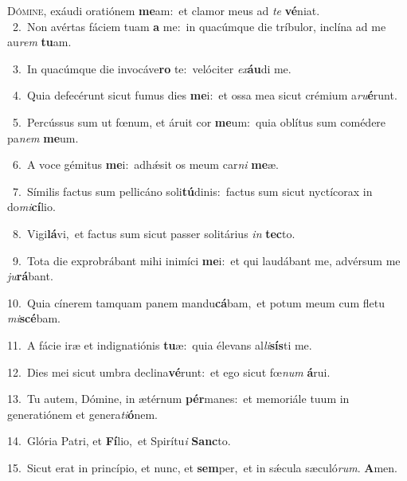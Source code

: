 \lettrine{\initial\textcolor{\initialcolor}{D}}{ómine,} exáudi oratiónem \textbf{me}\-am:~\star et clamor meus ad \textit{te} \textbf{vé}\-niat.\\
{\numbfont\textcolor{\numbcolor}{~2.}}~Non avértas fáciem tuam \textbf{a} me:~\star in quacúmque die tríbulor, inclína ad me au\textit{rem} \textbf{tu}\-am.\par
{\numbfont\textcolor{\numbcolor}{~3.}}~In quacúmque die invocáve\textbf{ro} te:~\star velóciter \textit{ex}\-\textbf{áu}di me.\par
{\numbfont\textcolor{\numbcolor}{~4.}}~Quia defecérunt sicut fumus dies \textbf{me}\-i:~\star et ossa mea sicut crémium a\-\textit{ru}\-\textbf{é}runt.\par
{\numbfont\textcolor{\numbcolor}{~5.}}~Percússus sum ut fœnum, et áruit cor \textbf{me}\-um:~\star quia oblítus sum comédere pa\textit{nem} \textbf{me}\-um.\par
{\numbfont\textcolor{\numbcolor}{~6.}}~A voce gémitus \textbf{me}\-i:~\star adhǽsit os meum car\textit{ni} \textbf{me}\-æ.\par
{\numbfont\textcolor{\numbcolor}{~7.}}~Símilis factus sum pellicáno soli\-\textbf{tú}\-dinis:~\star factus sum sicut nyctícorax in do\-\textit{mi}\-\textbf{cí}lio.\par
{\numbfont\textcolor{\numbcolor}{~8.}}~Vigi\-\textbf{lá}\-vi,~\star et factus sum sicut passer solitárius \textit{in} \textbf{tec}\-to.\par
{\numbfont\textcolor{\numbcolor}{~9.}}~Tota die exprobrábant mihi inimíci \textbf{me}\-i:~\star et qui laudábant me, advérsum me \textit{ju}\-\textbf{rá}bant.\par
{\numbfont\textcolor{\numbcolor}{10.}}~Quia cínerem tamquam panem mandu\-\textbf{cá}\-bam,~\star et potum meum cum fletu \textit{mi}\-\textbf{scé}bam.\par
{\numbfont\textcolor{\numbcolor}{11.}}~A fácie iræ et indignatiónis \textbf{tu}\-æ:~\star quia élevans al\-\textit{li}\-\textbf{sís}ti me.\par
{\numbfont\textcolor{\numbcolor}{12.}}~Dies mei sicut umbra declina\-\textbf{vé}\-runt:~\star et ego sicut fœ\textit{num} \textbf{á}\-rui.\par
{\numbfont\textcolor{\numbcolor}{13.}}~Tu autem, Dómine, in ætérnum \textbf{pér}\-manes:~\star et memoriále tuum in generatiónem et genera\-\textit{ti}\-\textbf{ó}nem.\par
{\numbfont\textcolor{\numbcolor}{14.}}~Glória Patri, et \textbf{Fí}\-lio,~\star et Spirítu\textit{i} \textbf{Sanc}\-to.\par
{\numbfont\textcolor{\numbcolor}{15.}}~Sicut erat in princípio, et nunc, et \textbf{sem}\-per,~\star et in sǽcula sæculó\-\textit{rum}\-. \textbf{A}\-men.\par
